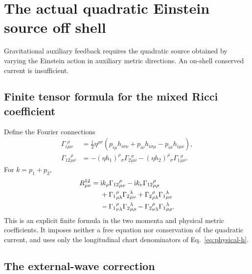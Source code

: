 \documentclass[11pt]{article}
\newcommand{\ii}{\mathrm i}
\begin{document}
\section{The actual quadratic Einstein source off shell}
\label{sec:source}

Gravitational auxiliary feedback requires the quadratic source obtained by varying the Einstein action in auxiliary metric directions.
An on-shell conserved current is insufficient.

\subsection{Finite tensor formula for the mixed Ricci coefficient}

Define the Fourier connections
\begin{align}
 \Gamma_i{}^\rho_{\mu\nu}
 &=\frac{\ii}{2}\eta^{\rho\sigma}
 (p_{i\mu}h_{i\sigma\nu}+p_{i\nu}h_{i\sigma\mu}-p_{i\sigma}h_{i\mu\nu}),
 \label{eq:gamma1}\\
 \Gamma_{12}{}^\rho_{\mu\nu}
 &=-(\eta h_1)^\rho{}_{\sigma}\Gamma_2{}^\sigma_{\mu\nu}
   -(\eta h_2)^\rho{}_{\sigma}\Gamma_1{}^\sigma_{\mu\nu}.
 \label{eq:gamma12}
\end{align}
For \(k=p_1+p_2\),
\begin{align}
 R^{12}_{\mu\nu}={}&\ii k_\rho\Gamma_{12}{}^\rho_{\mu\nu}
 -\ii k_\nu\Gamma_{12}{}^\rho_{\mu\rho}\notag\\
 &+\Gamma_1{}^\rho_{\rho\lambda}\Gamma_2{}^\lambda_{\mu\nu}
  +\Gamma_2{}^\rho_{\rho\lambda}\Gamma_1{}^\lambda_{\mu\nu}\notag\\
 &-\Gamma_1{}^\rho_{\nu\lambda}\Gamma_2{}^\lambda_{\mu\rho}
  -\Gamma_2{}^\rho_{\nu\lambda}\Gamma_1{}^\lambda_{\mu\rho}.
 \label{eq:ric12}
\end{align}
This is an explicit finite formula in the two momenta and physical metric coefficients.
It imposes neither a free equation nor conservation of the quadratic current, and uses only the longitudinal chart denominators of Eq.~\eqref{eq:physical-h}.

\subsection{The external-wave correction}
\end{document}
